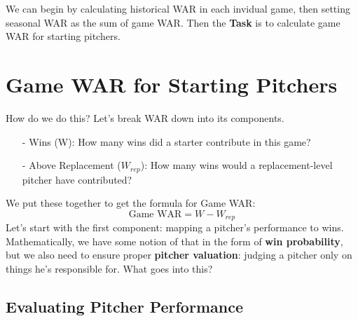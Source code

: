\documentclass[twoside]{article}
\theoremstyle{definition}
\begin{document}
We can begin by calculating historical WAR in each invidual game, then setting seasonal WAR as the sum of game WAR. Then the \textbf{Task} is to calculate game WAR for starting pitchers.

\section{Game WAR for Starting Pitchers}

How do we do this? Let's break WAR down into its components.
\begin{itemize}
    \item[-] Wins (W): How many wins did a starter contribute in this game?
    \item[-] Above Replacement ($W_{rep}$): How many wins would a replacement-level pitcher have contributed? 
\end{itemize}
We put these together to get the formula for Game WAR:
\begin{equation}
    \text{Game WAR} = W - W_{rep}
\end{equation}
Let's start with the first component: mapping a pitcher's performance to wins. Mathematically, we have some notion of that in the form of \textbf{win probability}, but we also need to ensure proper \textbf{pitcher valuation}: judging a pitcher only on things he's responsible for. What goes into this?

\subsection{Evaluating Pitcher Performance}
\end{document}
